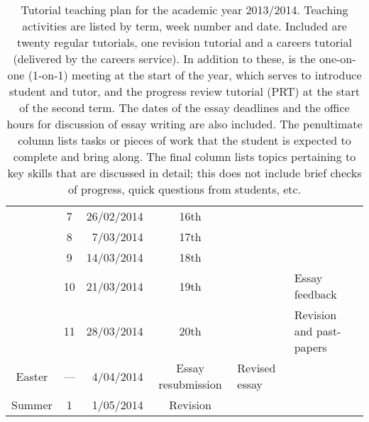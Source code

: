 \begin{table}
\begin{tabular}{c c r c l l}
			 & \hphantom{0}7 &	26/02/2014 & 16th		&			& \\
			 & \hphantom{0}8 &	 7/03/2014 & 17th		&			& \\
			 & \hphantom{0}9 &	14/03/2014 & 18th		&			& \\
			 & 10		 &	21/03/2014 & 19th		&			& Essay feedback \\
			 & 11		 &	28/03/2014 & 20th		&			& Revision and past-papers \\
\midrule
\multirow{1}{*}{Easter} & \multicolumn{1}{c}{---} & 4/04/2014 & Essay resubmission & Revised essay	& \\
\midrule
\multirow{1}{*}{Summer}	 & \hphantom{0}1 &	 1/05/2014 & Revision		&			& \\
 \bottomrule
\end{tabular}
\caption{Tutorial teaching plan for the academic year 2013/2014. Teaching activities are listed by term, week number and date. Included are twenty regular tutorials, one revision tutorial and a careers tutorial (delivered by the careers service). In addition to these, is the one-on-one (1-on-1) meeting at the start of the year, which serves to introduce student and tutor, and the progress review tutorial (PRT) at the start of the second term. The dates of the essay deadlines and the office hours for discussion of essay writing are also included. The penultimate column lists tasks or pieces of work that the student is expected to complete and bring along. The final column lists topics pertaining to key skills that are discussed in detail; this does not include brief checks of progress, quick questions from students, etc.}\label{tab:2013-14}
\end{table}
